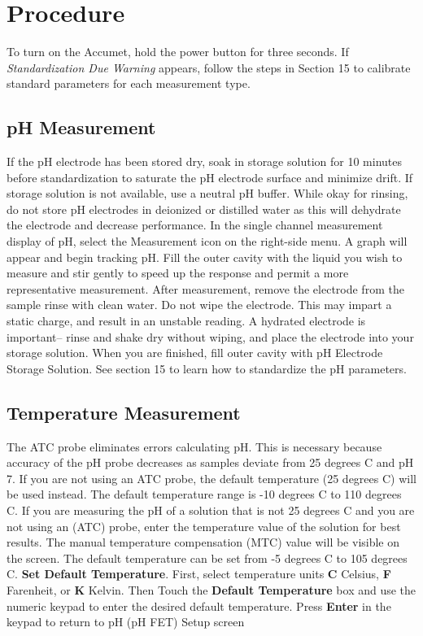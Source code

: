 \documentclass[12pt]{../SOP3}\usepackage[]{graphicx}\usepackage[]{color}
\begin{document}
\section{Procedure}

\NP To turn on the Accumet, hold the power button for three seconds.
\NP If \emph{Standardization Due Warning} appears, follow the steps in Section 15 to calibrate standard parameters for each measurement type.

\subsection{pH Measurement}
\NP If the pH electrode has been stored dry, soak in storage solution for 10 minutes before standardization to saturate the pH electrode surface and minimize drift. If storage solution is not available, use a neutral pH buffer. While okay for rinsing, do not store pH electrodes in deionized or distilled water as this will dehydrate the electrode and decrease performance.
\NP In the single channel measurement display of pH, select the Measurement icon on the right-side menu. A graph will appear and begin tracking pH.
\NP Fill the outer cavity with the liquid you wish to measure and stir gently to speed up the response and permit a more representative measurement.
\NP After measurement, remove the electrode from the sample rinse with clean water. Do not wipe the electrode. This may impart a static charge, and result in an unstable reading. A hydrated electrode is important– rinse and shake dry without wiping, and place the electrode into your storage solution.
\NP When you are finished, fill outer cavity with pH Electrode Storage Solution.
\NP See section 15 to learn how to standardize the pH parameters.

\subsection{Temperature Measurement}
\NP The ATC probe eliminates errors calculating pH. This is necessary because accuracy of the pH probe decreases as samples deviate from 25 degrees C and pH 7. If you are not using an ATC probe, the default temperature (25 degrees C) will be used instead. The default temperature range is -10 degrees C to 110 degrees C. 
\NP If  you  are measuring the  pH  of  a  solution  that  is  not  25 degrees C  and  you  are  not  using  an (ATC)  probe, enter  the  temperature  value  of  the  solution  for  best  results.
The manual temperature compensation (MTC) value will be visible on the screen. The default temperature can be set from -5 degrees C to 105 degrees C.
\NP\textbf{Set Default Temperature}. First, select temperature units \textbf{C} Celsius, \textbf{F} Farenheit, or \textbf{K} Kelvin. Then Touch the \textbf{Default Temperature} box and use the numeric keypad to enter the desired default temperature.
Press \textbf{Enter} in the keypad to return to pH (pH FET) Setup screen
\end{document}
